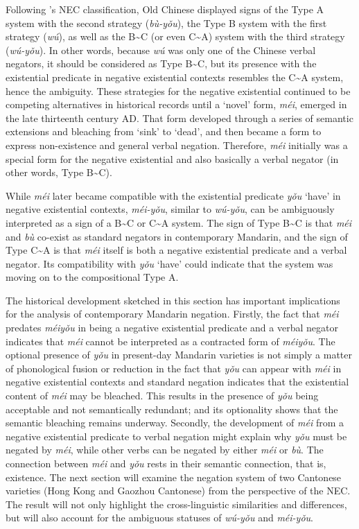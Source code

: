 \documentclass[output=paper,colorlinks,citecolor=brown,chinesefont]{langscibook}
\begin{document}
Following \citeauthor{Croft1991}'s NEC classification, Old Chinese displayed signs of the Type A system with the second strategy (\textit{bù-yǒu}), the Type B system with the first strategy (\textit{wú}), as well as the B\sim C (or even C\sim A) system with the third strategy (\textit{wú-yǒu}). In other words, because \textit{wú} was only one of the Chinese verbal negators, it should be considered as Type B\sim C, but its presence with the existential predicate in negative existential contexts resembles the C\sim A system, hence the ambiguity. These strategies for the negative existential continued to be competing alternatives in historical records until a `novel' form, \textit{méi}, emerged in the late thirteenth century AD. That form developed through a series of semantic extensions and bleaching from `sink' to `dead', and then became a form to express non-existence and general verbal negation. Therefore, \textit{méi} initially was a special form for the negative existential and also basically a verbal negator (in other words, Type B\sim C). 

While \textit{méi} later became compatible with the existential predicate \textit{yǒu} `have' in negative existential contexts, \textit{méi-yǒu}, similar to \textit{wú-yǒu}, can be ambiguously interpreted as a sign of a B\sim C or C\sim A system. The sign of Type B\sim C is that \textit{méi} and \textit{bù} co-exist as standard negators in contemporary Mandarin, and the sign of Type C\sim A is that \textit{méi} itself is both a negative existential predicate and a verbal negator. Its compatibility with \textit{yǒu} `have' could indicate that the system was moving on to the compositional Type A. \par 
The historical development sketched in this section has important implications for the analysis of contemporary Mandarin negation. Firstly, the fact that \textit{méi} predates \textit{méiyǒu} in being a negative existential predicate and a verbal negator indicates that \textit{méi} cannot be interpreted as a contracted form of \textit{méiyǒu}. The optional presence of \textit{yǒu} in present-day Mandarin varieties is not simply a matter of phonological fusion or reduction in the fact that \textit{yǒu} can appear with \textit{méi} in negative existential contexts and standard negation indicates that the existential content of \textit{méi} may be bleached. This results in the presence of \textit{yǒu} being acceptable and not semantically redundant; and its optionality shows that the semantic bleaching remains underway. Secondly, the development of \textit{méi} from a negative existential predicate to verbal negation might explain why \textit{yǒu} must be negated by \textit{méi}, while other verbs can be negated by either \textit{méi} or \textit{bù}. The connection between \textit{méi} and \textit{yǒu} rests in their semantic connection, that is, existence. The next section will examine the negation system of two Cantonese varieties (Hong Kong and Gaozhou Cantonese) from the perspective of the NEC. The result will not only highlight the cross-linguistic similarities and differences, but will also account for the ambiguous statuses of \textit{wú-yǒu} and \textit{méi-yǒu}. 
\end{document}
